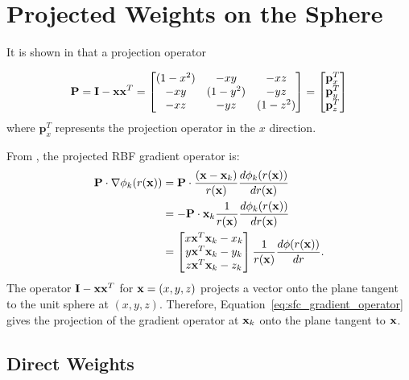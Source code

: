 %
% 
%
%


\chapter{Projected Weights on the Sphere} 
It is shown in \cite{FlyerWright09, FlyerLehto11} that a projection operator

$$ 
\mathbf{P} =  \mathbf{I} - \mathbf{x} \mathbf{x}^{T} = \begin{bmatrix} 
(1 - x^{2}) & -xy & -xz \\ 
-xy & (1 - y^{2}) & -yz \\ 
-xz & -yz & (1-z^{2})
\end{bmatrix} = \begin{bmatrix} \mathbf{p}_{x}^{T} \\ \mathbf{p}_{y}^{T} \\ \mathbf{p}_{z}^{T} \end{bmatrix}
$$
where $\mathbf{p}_{x}^{T}$ represents the projection operator in the $x$ direction. 

From \cite{FlyerWright09}, the projected RBF gradient operator is:
\begin{align}
\mathbf{P} \cdot \nabla \phi_{k}(r(\vx)) & = \mathbf{P} \cdot \frac{(\vx-\vx_{k})}{r(\vx)} \d{\phi_{k}(r(\vx))}{r(\vx)}  \nonumber \\
& = -\mathbf{P} \cdot \vx_{k}\frac{1}{r(\vx)} \d{\phi_{k}(r(\vx))}{r(\vx)}  \nonumber \\ %
& = \begin{bmatrix} x \vx^{T} \vx_{k} - x_{k} \\  y \vx^{T} \vx_{k} - y_{k} \\  z \vx^{T} \vx_{k} - z_{k} \end{bmatrix} \frac{1}{r(\vx)} \d{\phi(r(\vx))}{r} \label{eq:sfc_gradient_operator}.
\end{align}
The operator $\mathbf{I} - \mathbf{x} \mathbf{x}^{T}$ for $\mathbf{x} = (x,y,z)$ projects a vector onto the plane tangent to the unit sphere at $(x,y,z)$. Therefore, Equation~\ref{eq:sfc_gradient_operator} gives the projection of the gradient operator at $\mathbf{x}_{k}$ onto the plane tangent to $\mathbf{x}$. 

\section{Direct Weights} 

